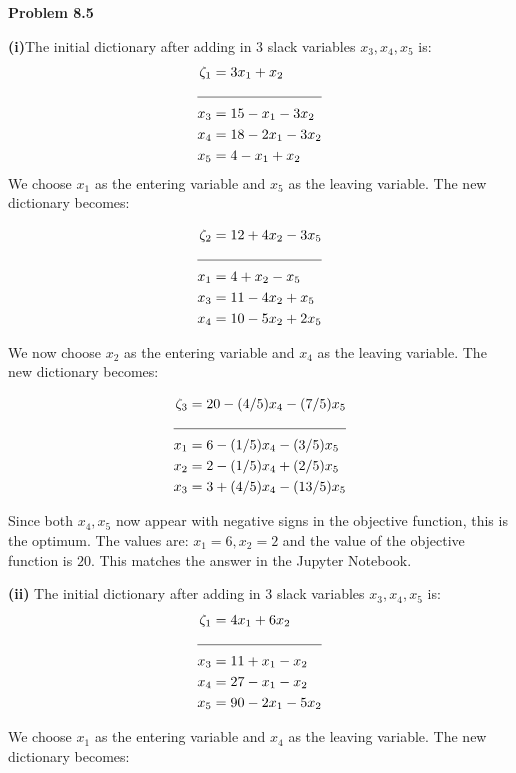 \documentclass[letterpaper,12pt]{article}
\theoremstyle{definition}
\begin{document}
\noindent\textbf{Problem 8.5}


\textbf{(i)}The initial dictionary after adding in 3 slack variables $x_3, x_4, x_5$ is:
  \begin{align*}
      \zeta_1 &= 3x_1+x_2\\
      \cline{1-2}
      x_3 &= 15 - x_1 - 3x_2\\
      x_4 &= 18-2x_1-3x_2\\
      x_5 &= 4-x_1+x_2
  \end{align*}
We choose $x_1$ as the entering variable and $x_5$ as the leaving variable. The new dictionary becomes:

\begin{align*}
    \zeta_2 &= 12+4x_2-3x_5\\
    \cline{1-2}
    x_1 &= 4 + x_2 - x_5\\
    x_3 &= 11-4x_2+ x_5\\
    x_4 &= 10-5x_2+2x_5\\
\end{align*}

We now choose $x_2$ as the entering variable and $x_4$ as the leaving variable. The new dictionary becomes:

\begin{align*}
    \zeta_3 &= 20 - (4/5)x_4 - (7/5)x_5\\
    \cline{1-2}
    x_1 &= 6 - (1/5)x_4 - (3/5)x_5\\
    x_2 &= 2-(1/5)x_4+ (2/5)x_5\\
    x_3 &= 3 + (4/5)x_4 -(13/5)x_5\\
\end{align*}

Since both $x_4, x_5$ now appear with negative signs in the objective function, this is the optimum. The
values are: $x_1= 6, x_2=2$ and the value of the objective function is $20$. This matches the answer in the
Jupyter Notebook.

\textbf{(ii)} The initial dictionary after adding in 3 slack variables $x_3, x_4, x_5$ is:
\begin{align*}
      \zeta_1 &= 4x_1+6x_2\\
      \cline{1-2}
      x_3 &= 11 + x_1 - x_2\\
      x_4 &= 27-x_1-x_2\\
      x_5 &= 90 - 2x_1 - 5x_2\\
\end{align*}

We choose $x_1$ as the entering variable and $x_4$ as the leaving variable. The new dictionary becomes:
\end{document}
